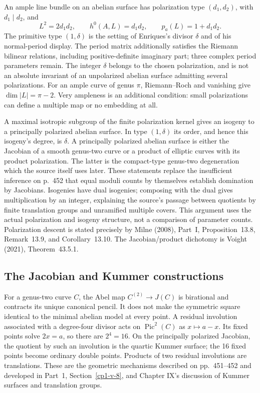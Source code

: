 An ample line bundle on an abelian surface has polarization type \((d_1,d_2)\), with \(d_1\mid d_2\), and
\[
L^2=2d_1d_2,\qquad h^0(A,L)=d_1d_2,\qquad
p_a(L)=1+d_1d_2.
\]
The primitive type \((1,\delta)\) is the setting of Enriques's divisor \(\delta\) and of his normal-period display. The period matrix additionally satisfies the Riemann bilinear relations, including positive-definite imaginary part; three complex period parameters remain. The integer \(\delta\) belongs to the chosen polarization, and is not an absolute invariant of an unpolarized abelian surface admitting several polarizations. For an ample curve of genus \(\pi\), Riemann--Roch and vanishing give \(\dim|L|=\pi-2\). Very ampleness is an additional condition: small polarizations can define a multiple map or no embedding at all.

A maximal isotropic subgroup of the finite polarization kernel gives an isogeny to a principally polarized abelian surface. In type \((1,\delta)\) its order, and hence this isogeny's degree, is \(\delta\). A principally polarized abelian surface is either the Jacobian of a smooth genus-two curve or a product of elliptic curves with its product polarization. The latter is the compact-type genus-two degeneration which the source itself uses later. These statements replace the insufficient inference on p.~452 that equal moduli counts by themselves establish domination by Jacobians. Isogenies have dual isogenies; composing with the dual gives multiplication by an integer, explaining the source's passage between quotients by finite translation groups and unramified multiple covers. This argument uses the actual polarization and isogeny structure, not a comparison of parameter counts. Polarization descent is stated precisely by Milne (2008), Part~I, Proposition~13.8, Remark~13.9, and Corollary~13.10. The Jacobian/product dichotomy is Voight (2021), Theorem~43.5.1.

\subsection{The Jacobian and Kummer constructions}

For a genus-two curve \(C\), the Abel map \(C^{(2)}\to J(C)\) is birational and contracts its unique canonical pencil. It does not make the symmetric square identical to the minimal abelian model at every point. A residual involution associated with a degree-four divisor acts on \(\operatorname{Pic}^2(C)\) as \(x\mapsto a-x\). Its fixed points solve \(2x=a\), so there are \(2^4=16\). On the principally polarized Jacobian, the quotient by such an involution is the quartic Kummer surface; the 16 fixed points become ordinary double points. Products of two residual involutions are translations. These are the geometric mechanisms described on pp.~451--452 and developed in Part~1, Section~\ref{cp1-v-8}, and Chapter IX's discussion of Kummer surfaces and translation groups.

